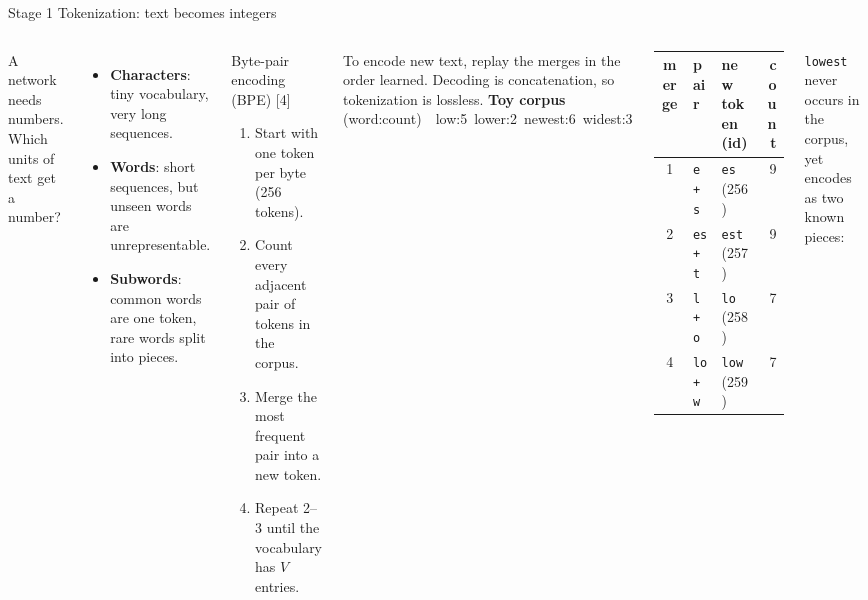 \documentclass[aspectratio=169,10pt]{beamer}
\renewcommand{\cite}[1]{{\scriptsize\color{cTok}[#1]}}
\newcommand{\key}[1]{\textbf{\color{cAtt}#1}}
\begin{document}
\begin{frame}{Stage 1 \textbullet{} Tokenization: text becomes integers}
\begin{columns}[T,onlytextwidth]
\small
A network needs numbers. Which units of text get a number?
\begin{itemize}
  \item \textbf{Characters}: tiny vocabulary, very long sequences.
  \item \textbf{Words}: short sequences, but unseen words are unrepresentable.
  \item \key{Subwords}: common words are one token, rare words split into pieces.
\end{itemize}
\begin{block}{Byte-pair encoding (BPE) \cite{4}}
\begin{enumerate}\small
  \item Start with one token per byte (256 tokens).
  \item Count every adjacent pair of tokens in the corpus.
  \item Merge the most frequent pair into a new token.
  \item Repeat 2--3 until the vocabulary has $V$ entries.
\end{enumerate}
\end{block}
To encode new text, replay the merges in the order learned. Decoding is concatenation, so
tokenization is lossless.
\small
\textbf{Toy corpus} (word:count)\ \ {\ttfamily\footnotesize low:5\ lower:2\ newest:6\ widest:3}

\vspace{1mm}
{\footnotesize
\begin{tabular}{@{}cllr@{}}
\toprule
merge & pair & new token (id) & count\\
\midrule
1 & \texttt{e + s}   & \texttt{es} (256)   & 9\\
2 & \texttt{es + t}  & \texttt{est} (257)  & 9\\
3 & \texttt{l + o}   & \texttt{lo} (258)   & 7\\
4 & \texttt{lo + w}  & \texttt{low} (259)  & 7\\
\bottomrule
\end{tabular}}

\vspace{1mm}
\texttt{lowest} never occurs in the corpus, yet encodes as two known pieces:


\end{columns}
\end{frame}
\end{document}
